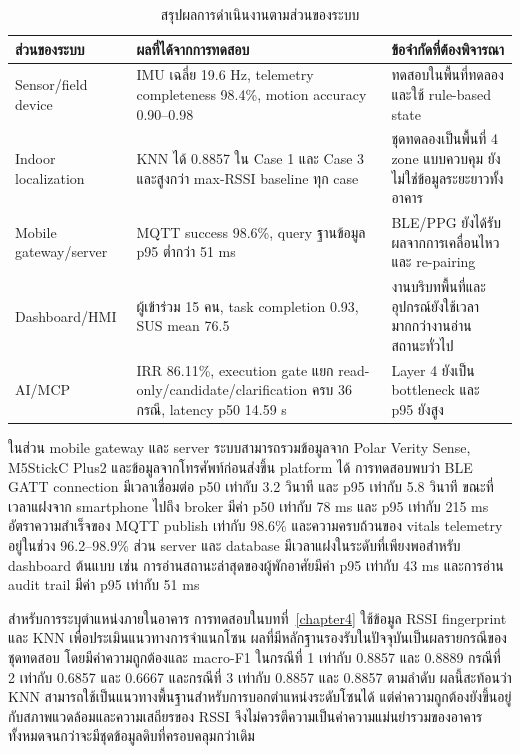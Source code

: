 \begin{table}[!htbp]
    \centering
    \caption{สรุปผลการดำเนินงานตามส่วนของระบบ}
    \label{tab:ch5_result_summary}
    \renewcommand{\arraystretch}{1.18}
    \small
    \setlength{\tabcolsep}{3pt}
    \begin{tabular}{|L{0.26\textwidth}|L{0.38\textwidth}|L{0.26\textwidth}|}
        \hline
        \textbf{ส่วนของระบบ} & \textbf{ผลที่ได้จากการทดสอบ} & \textbf{ข้อจำกัดที่ต้องพิจารณา} \\ \hline
        Sensor/field device & IMU เฉลี่ย 19.6 Hz, telemetry completeness 98.4\%, motion accuracy 0.90--0.98 & ทดสอบในพื้นที่ทดลองและใช้ rule-based state \\ \hline
        Indoor localization & KNN ได้ 0.8857 ใน Case 1 และ Case 3 และสูงกว่า max-RSSI baseline ทุก case & ชุดทดลองเป็นพื้นที่ 4 zone แบบควบคุม ยังไม่ใช่ข้อมูลระยะยาวทั้งอาคาร \\ \hline
        Mobile gateway/server & MQTT success 98.6\%, query ฐานข้อมูล p95 ต่ำกว่า 51 ms & BLE/PPG ยังได้รับผลจากการเคลื่อนไหวและ re-pairing \\ \hline
        Dashboard/HMI & ผู้เข้าร่วม 15 คน, task completion 0.93, SUS mean 76.5 & งานบริบทพื้นที่และอุปกรณ์ยังใช้เวลามากกว่างานอ่านสถานะทั่วไป \\ \hline
        AI/MCP & IRR 86.11\%, execution gate แยก read-only/candidate/clarification ครบ 36 กรณี, latency p50 14.59 s & Layer 4 ยังเป็น bottleneck และ p95 ยังสูง \\ \hline
    \end{tabular}
\end{table}

ในส่วน mobile gateway และ server ระบบสามารถรวมข้อมูลจาก Polar Verity Sense, M5StickC Plus2 และข้อมูลจากโทรศัพท์ก่อนส่งขึ้น platform ได้ การทดสอบพบว่า BLE GATT connection มีเวลาเชื่อมต่อ p50 เท่ากับ 3.2 วินาที และ p95 เท่ากับ 5.8 วินาที ขณะที่เวลาแฝงจาก smartphone ไปถึง broker มีค่า p50 เท่ากับ 78 ms และ p95 เท่ากับ 215 ms อัตราความสำเร็จของ MQTT publish เท่ากับ 98.6\% และความครบถ้วนของ vitals telemetry อยู่ในช่วง 96.2--98.9\% ส่วน server และ database มีเวลาแฝงในระดับที่เพียงพอสำหรับ dashboard ต้นแบบ เช่น การอ่านสถานะล่าสุดของผู้พักอาศัยมีค่า p95 เท่ากับ 43 ms และการอ่าน audit trail มีค่า p95 เท่ากับ 51 ms

สำหรับการระบุตำแหน่งภายในอาคาร การทดสอบในบทที่~\ref{chapter4} ใช้ข้อมูล RSSI fingerprint และ KNN เพื่อประเมินแนวทางการจำแนกโซน ผลที่มีหลักฐานรองรับในปัจจุบันเป็นผลรายกรณีของชุดทดสอบ โดยมีค่าความถูกต้องและ macro-F1 ในกรณีที่ 1 เท่ากับ 0.8857 และ 0.8889 กรณีที่ 2 เท่ากับ 0.6857 และ 0.6667 และกรณีที่ 3 เท่ากับ 0.8857 และ 0.8857 ตามลำดับ ผลนี้สะท้อนว่า KNN สามารถใช้เป็นแนวทางพื้นฐานสำหรับการบอกตำแหน่งระดับโซนได้ แต่ค่าความถูกต้องยังขึ้นอยู่กับสภาพแวดล้อมและความเสถียรของ RSSI จึงไม่ควรตีความเป็นค่าความแม่นยำรวมของอาคารทั้งหมดจนกว่าจะมีชุดข้อมูลดิบที่ครอบคลุมกว่าเดิม

